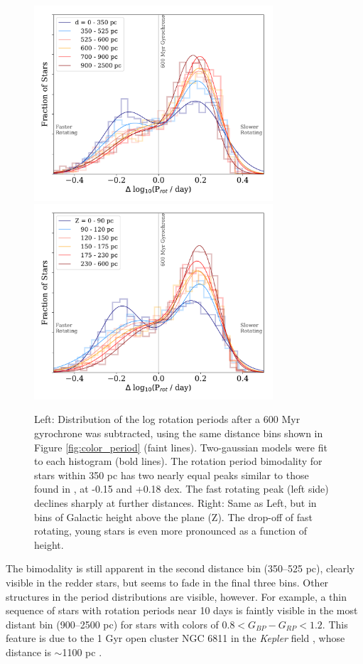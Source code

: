 \documentclass[trackchanges,preprint2]{aastex62}
\newcommand{\Kepler}{\textsl{Kepler}\xspace}
\begin{document}
\begin{figure}[!ht]
\centering
\includegraphics[width=3.5in]{fig4a}
\includegraphics[width=3.5in]{fig4b}
\caption{Left: Distribution of the log rotation periods after a 600 Myr gyrochrone was subtracted, using the same distance bins shown in Figure \ref{fig:color_period} (faint lines). Two-gaussian models were fit to each histogram (bold lines). 
The rotation period bimodality for stars within 350 pc has two nearly equal peaks similar to those found in \citet{davenport2017}, at -0.15 and +0.18 dex. The fast rotating peak (left side) declines sharply at further distances.
Right: Same as Left, but in bins of Galactic height above the plane (Z). The drop-off of fast rotating, young stars is even more pronounced as a function of height.
}
\label{fig:per_hist}
\end{figure}


The bimodality is still apparent in the second distance bin (350--525 pc), clearly visible in the redder stars, but seems to fade in the final three bins. Other structures in the period distributions are visible, however. For example, a thin sequence of stars with rotation periods near 10 days is faintly visible in the most distant bin (900--2500 pc) for stars with colors of $0.8<G_{BP}-G_{RP}<1.2$. This feature is due to the 1 Gyr open cluster NGC 6811 in the \Kepler field \citep{meibom2011}, whose distance is $\sim$1100 pc \citep{sandquist2016}.
\end{document}
